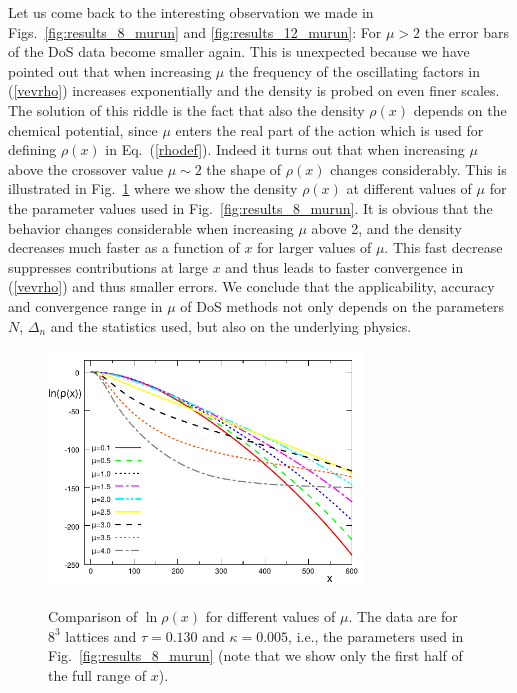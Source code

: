 \documentclass[a4paper,11pt]{article}
\begin{document}
Let us come back to the interesting observation we made in 
Figs.~\ref{fig:results_8_murun} and \ref{fig:results_12_murun}: 
For $\mu > 2$ the error bars of the DoS data 
become smaller again. This is unexpected because we have pointed out that when 
increasing $\mu$ the frequency of the oscillating factors in (\ref{vevrho}) increases exponentially and the density 
is probed on even finer scales. The solution of this riddle is the fact that also the density $\rho(x)$ depends
on the chemical potential, since $\mu$ enters the real part of the action which is used for defining $\rho(x)$ in 
Eq.~(\ref{rhodef}). Indeed it turns out that when increasing $\mu$ above the crossover value $\mu \sim 2$ the 
shape of $\rho(x)$ changes considerably. This is illustrated in Fig.~\ref{fig:rho-change-zoom} where we 
show the density $\rho(x)$ at different values of $\mu$ for the parameter values used in Fig.~\ref{fig:results_8_murun}. 
It is obvious that the behavior changes considerable when increasing $\mu$ above 2, and the density decreases
much faster as a function of $x$ for larger values of $\mu$. This fast decrease suppresses contributions at 
large $x$ and thus leads to faster convergence in (\ref{vevrho}) and thus smaller errors. We conclude that the 
applicability, accuracy and convergence range in $\mu$ of DoS methods not only depends on the parameters 
$N$, $\Delta_n$ and the statistics used, but also on the underlying physics.

\begin{figure}[t]
\centering
{\includegraphics[width=0.75\textwidth]{Rho_change.pdf}}
\caption{Comparison of  $\ln \rho(x)$ for different values of $\mu$. The data are for $8^3$ lattices and 
$\tau=0.130$ and $\kappa=0.005$, i.e., the parameters used in Fig.~\ref{fig:results_8_murun} (note that we show 
only the first half of the full range of $x$).}
\label{fig:rho-change-zoom}
\end{figure}
\end{document}
